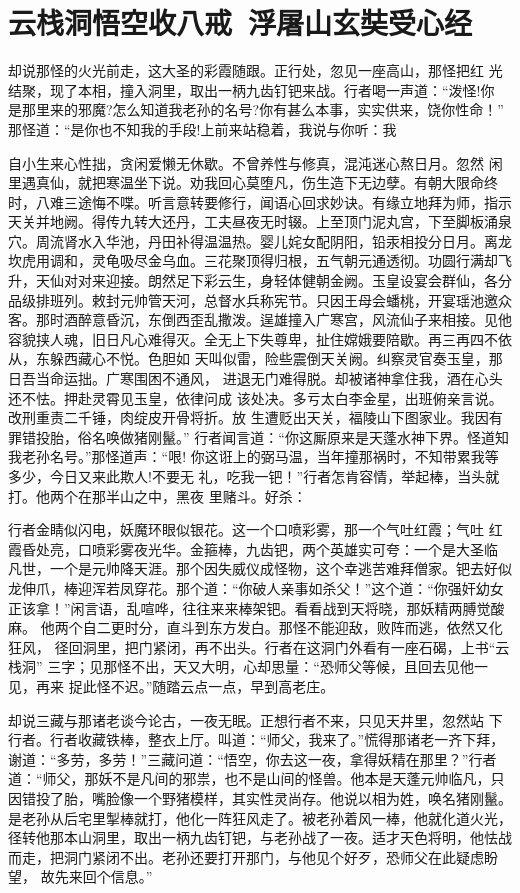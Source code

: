 \chapter{云栈洞悟空收八戒~浮屠山玄奘受心经}

却说那怪的火光前走，这大圣的彩霞随跟。正行处，忽见一座高山，那怪把红
光结聚，现了本相，撞入洞里，取出一柄九齿钉钯来战。行者喝一声道：“泼怪!你
是那里来的邪魔?怎么知道我老孙的名号?你有甚么本事，实实供来，饶你性命！”
那怪道：“是你也不知我的手段!上前来站稳着，我说与你听：我

自小生来心性拙，贪闲爱懒无休歇。不曾养性与修真，混沌迷心熬日月。忽然
闲里遇真仙，就把寒温坐下说。劝我回心莫堕凡，伤生造下无边孽。有朝大限命终
时，八难三途悔不喋。听言意转要修行，闻语心回求妙诀。有缘立地拜为师，指示
天关并地阙。得传九转大还丹，工夫昼夜无时辍。上至顶门泥丸宫，下至脚板涌泉
穴。周流肾水入华池，丹田补得温温热。婴儿姹女配阴阳，铅汞相投分日月。离龙
坎虎用调和，灵龟吸尽金乌血。三花聚顶得归根，五气朝元通透彻。功圆行满却飞
升，天仙对对来迎接。朗然足下彩云生，身轻体健朝金阙。玉皇设宴会群仙，各分
品级排班列。敕封元帅管天河，总督水兵称宪节。只因王母会蟠桃，开宴瑶池邀众
客。那时酒醉意昏沉，东倒西歪乱撒泼。逞雄撞入广寒宫，风流仙子来相接。见他
容貌挟人魂，旧日凡心难得灭。全无上下失尊卑，扯住嫦娥要陪歇。再三再四不依
从，东躲西藏心不悦。色胆如
天叫似雷，险些震倒天关阙。纠察灵官奏玉皇，那日吾当命运拙。广寒围困不通风，
进退无门难得脱。却被诸神拿住我，酒在心头还不怯。押赴灵霄见玉皇，依律问成
该处决。多亏太白李金星，出班俯亲言说。改刑重责二千锤，肉绽皮开骨将折。放
生遭贬出天关，福陵山下图家业。我因有罪错投胎，俗名唤做猪刚鬣。”
行者闻言道：“你这厮原来是天蓬水神下界。怪道知我老孙名号。”那怪道声：“哏!
你这诳上的弼马温，当年撞那祸时，不知带累我等多少，今日又来此欺人!不要无
礼，吃我一钯！”行者怎肯容情，举起棒，当头就打。他两个在那半山之中，黑夜
里赌斗。好杀：

行者金睛似闪电，妖魔环眼似银花。这一个口喷彩雾，那一个气吐红霞；气吐
红霞昏处亮，口喷彩雾夜光华。金箍棒，九齿钯，两个英雄实可夸：一个是大圣临
凡世，一个是元帅降天涯。那个因失威仪成怪物，这个幸逃苦难拜僧家。钯去好似
龙伸爪，棒迎浑若凤穿花。那个道：“你破人亲事如杀父！”这个道：“你强奸幼女
正该拿！”闲言语，乱喧哗，往往来来棒架钯。看看战到天将晓，那妖精两膊觉酸
麻。
他两个自二更时分，直斗到东方发白。那怪不能迎敌，败阵而逃，依然又化狂风，
径回洞里，把门紧闭，再不出头。行者在这洞门外看有一座石碣，上书“云栈洞”
三字；见那怪不出，天又大明，心却思量：“恐师父等候，且回去见他一见，再来
捉此怪不迟。”随踏云点一点，早到高老庄。

却说三藏与那诸老谈今论古，一夜无眠。正想行者不来，只见天井里，忽然站
下行者。行者收藏铁棒，整衣上厅。叫道：“师父，我来了。”慌得那诸老一齐下拜，
谢道：“多劳，多劳！”三藏问道：“悟空，你去这一夜，拿得妖精在那里？”行者
道：“师父，那妖不是凡间的邪祟，也不是山间的怪兽。他本是天蓬元帅临凡，只
因错投了胎，嘴脸像一个野猪模样，其实性灵尚存。他说以相为姓，唤名猪刚鬣。
是老孙从后宅里掣棒就打，他化一阵狂风走了。被老孙着风一棒，他就化道火光，
径转他那本山洞里，取出一柄九齿钉钯，与老孙战了一夜。适才天色将明，他怯战
而走，把洞门紧闭不出。老孙还要打开那门，与他见个好歹，恐师父在此疑虑盼望，
故先来回个信息。”

